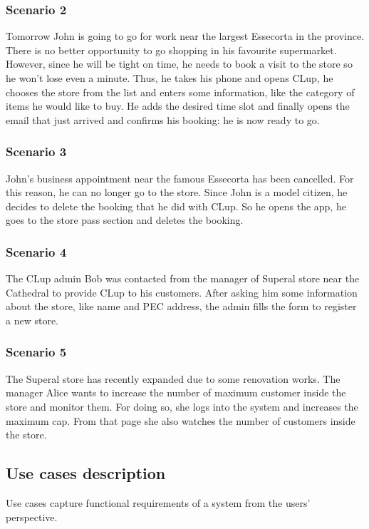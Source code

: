 \subsubsection{Scenario 2}\label{sc:second}
Tomorrow John is going to go for work near the largest Essecorta in the province. There is no better opportunity to go shopping in his favourite supermarket.\newline
However, since he will be tight on time, he needs to book a visit to the store so he won't lose even a minute. Thus, he takes his phone and opens CLup, he chooses the store from the list and enters some information, like the category of items he would like to buy. He adds the desired time slot and finally opens the email that just arrived and confirms his booking: he is now ready to go.

\subsubsection{Scenario 3}\label{sc:third}
John's business appointment near the famous Essecorta has been cancelled. For this reason, he can no longer go to the store.\newline
Since John is a model citizen, he decides to delete the booking that he did with CLup. So he opens the app, he goes to the store pass section and deletes the booking.

\subsubsection{Scenario 4}\label{sc:fourth}
The CLup admin Bob was contacted from the manager of Superal store near the Cathedral to provide CLup to his customers. After asking him some information about the store, like name and PEC address, the admin fills the form to register a new store.

\subsubsection{Scenario 5}\label{sc:fifth}
The Superal store has recently expanded due to some renovation works. The manager Alice wants to increase the number of maximum customer inside the store and monitor them.\newline
For doing so, she logs into the system and increases the maximum cap. From that page she also watches the number of customers inside the store.

\clearpage
\subsection{Use cases description}
Use cases capture functional requirements of a system from the users' perspective.

